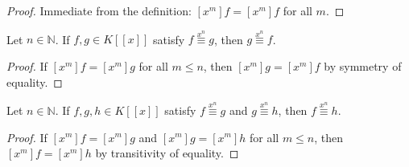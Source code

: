 \begin{proof}
\leanok
Immediate from the definition: $[x^m]f=[x^m]f$ for all $m$.
\end{proof}

\begin{lemma}
\label{lem.fps.xneq.symm}
\leanhelper
\leanok
Let $n\in\mathbb{N}$. If $f,g\in K[[x]]$ satisfy $f\overset{x^{n}}{\equiv}g$,
then $g\overset{x^{n}}{\equiv}f$.
\end{lemma}

\begin{proof}
\leanok
If $[x^m]f=[x^m]g$ for all $m\leq n$, then $[x^m]g=[x^m]f$ by symmetry of equality.
\end{proof}

\begin{lemma}
\label{lem.fps.xneq.trans}
\leanhelper
\leanok
Let $n\in\mathbb{N}$. If $f,g,h\in K[[x]]$ satisfy $f\overset{x^{n}}{\equiv}g$
and $g\overset{x^{n}}{\equiv}h$, then $f\overset{x^{n}}{\equiv}h$.
\end{lemma}

\begin{proof}
\leanok
If $[x^m]f=[x^m]g$ and $[x^m]g=[x^m]h$ for all $m\leq n$, then
$[x^m]f=[x^m]h$ by transitivity of equality.
\end{proof}

